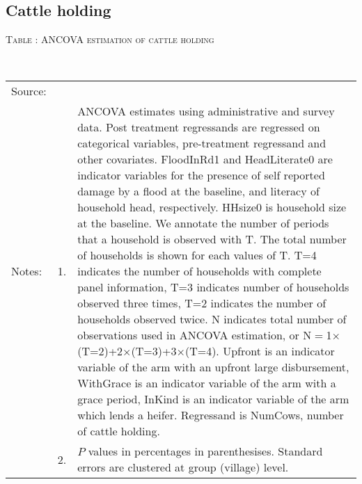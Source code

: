 \subsection{Cattle holding}


\hspace{-1cm}\begin{minipage}[t]{14cm}
\hfil\textsc{\normalsize Table \thetable: ANCOVA estimation of cattle holding\label{tab ANCOVA cow}}\\
\setlength{\tabcolsep}{1pt}
\setlength{\baselineskip}{8pt}
\renewcommand{\arraystretch}{.55}
\hfil{}\\
\renewcommand{\arraystretch}{.8}
\setlength{\tabcolsep}{1pt}
\begin{tabular}{>{\hfill\scriptsize}p{1cm}<{}>{\hfill\scriptsize}p{.25cm}<{}>{\scriptsize}p{12cm}<{\hfill}}
Source:& \multicolumn{2}{l}{\scriptsize Estimated with GUK administrative and survey data.}\\
Notes: & 1. & ANCOVA estimates using administrative and survey data. Post treatment regressands are regressed on categorical variables, pre-treatment regressand and other covariates. \textsf{FloodInRd1} and \textsf{HeadLiterate0} are indicator variables for the presence of self reported damage by a flood at the baseline, and literacy of household head, respectively. \textsf{HHsize0} is household size at the baseline. We annotate the number of periods that a household is observed with \textsf{T}. The total number of households is shown for each values of \textsf{T}. \textsf{T=4} indicates the number of households with complete panel information, \textsf{T=3} indicates number of households observed three times, \textsf{T=2} indicates the number of households observed twice. \textsf{N} indicates total number of observations used in ANCOVA estimation, or \textsf{N$=$1$\times$(T=2)+2$\times$(T=3)+3$\times$(T=4)}.  \textsf{Upfront} is an indicator variable of the arm with an upfront large disbursement, \textsf{WithGrace} is an indicator variable of the arm with a grace period, \textsf{InKind} is an indicator variable of the arm which lends a heifer. Regressand is \textsf{NumCows}, number of cattle holding. \\
& 2. & $P$ values in percentages in parenthesises. Standard errors are clustered at group (village) level.
\end{tabular}
\end{minipage}

